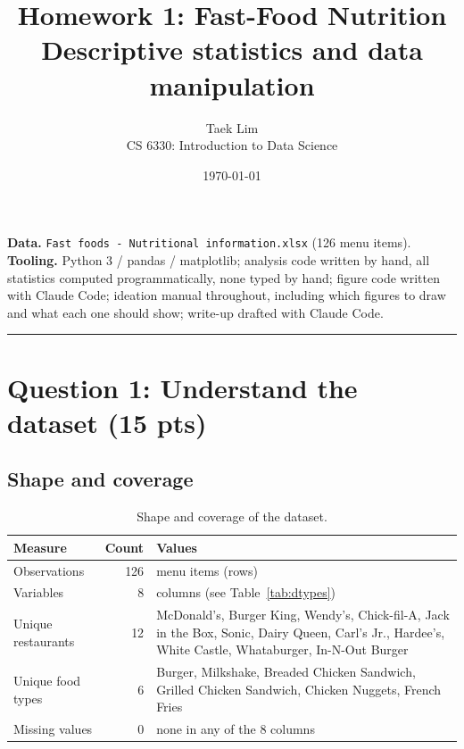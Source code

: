 \documentclass[11pt]{article}
\title{\textbf{Homework 1: Fast-Food Nutrition}\\[2pt]
       \large Descriptive statistics and data manipulation}
\author{Taek Lim \\ \small CS 6330: Introduction to Data Science}
\date{\today}
\newcommand{\question}[2]{%
  \section*{\color{headblue}#1 \hfill \normalfont\small(#2)}}
\begin{document}
\maketitle

\noindent
\textbf{Data.} \texttt{Fast foods - Nutritional information.xlsx} (126 menu items).\\
\textbf{Tooling.} Python 3 / pandas / matplotlib; analysis code written by hand,
all statistics computed programmatically, none typed by hand; figure code written with
Claude Code; ideation manual throughout, including which figures to draw and what
each one should show; write-up drafted with Claude Code.

\vspace{1em}\hrule\vspace{1em}

\question{Question 1: Understand the dataset}{15 pts}

\subsection*{Shape and coverage}
\begin{table}[H]\centering\small
\begin{tabular}{l r p{9.2cm}}
\toprule
Measure & Count & Values \\
\midrule
Observations       & 126 & menu items (rows) \\
Variables          & 8   & columns (see Table~\ref{tab:dtypes}) \\
Unique restaurants & 12  & McDonald's, Burger King, Wendy's, Chick-fil-A,
                          Jack in the Box, Sonic, Dairy Queen, Carl's Jr.,
                          Hardee's, White Castle, Whataburger, In-N-Out Burger \\
Unique food types  & 6   & Burger, Milkshake, Breaded Chicken Sandwich,
                          Grilled Chicken Sandwich, Chicken Nuggets, French Fries \\
Missing values     & 0   & none in any of the 8 columns \\
\bottomrule
\end{tabular}
\caption{Shape and coverage of the dataset.}
\end{table}
\end{document}
